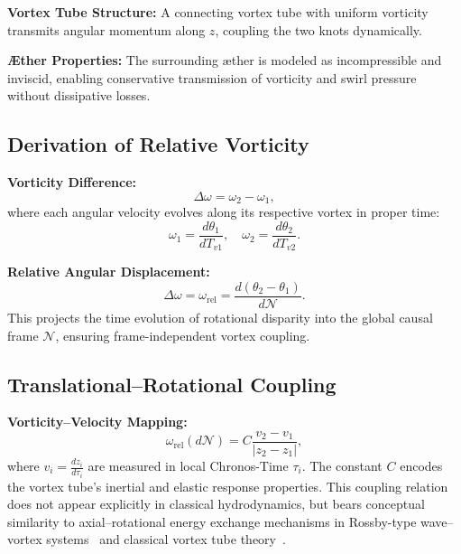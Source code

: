 \documentclass[12pt]{article}
\begin{document}
    \textbf{Vortex Tube Structure:} A connecting vortex tube with uniform vorticity transmits angular momentum along \( z \), coupling the two knots dynamically.

    \textbf{Æther Properties:} The surrounding æther is modeled as incompressible and inviscid, enabling conservative transmission of vorticity and swirl pressure without dissipative losses.

    \subsection{Derivation of Relative Vorticity}

    \textbf{Vorticity Difference:}
    \begin{equation*}
        \Delta \omega = \omega_2 - \omega_1,
    \end{equation*}
    where each angular velocity evolves along its respective vortex in proper time:
    \begin{equation*}
        \omega_1 = \frac{d\theta_1}{dT_{v1}}, \quad \omega_2 = \frac{d\theta_2}{dT_{v2}}.
    \end{equation*}

    \textbf{Relative Angular Displacement:}
    \begin{equation*}
        \Delta \omega = \omega_\text{rel} = \frac{d(\theta_2 - \theta_1)}{d\mathcal{N}}.
    \end{equation*}
    This projects the time evolution of rotational disparity into the global causal frame \( \mathcal{N} \), ensuring frame-independent vortex coupling.

    \subsection*{Translational–Rotational Coupling}

    \textbf{Vorticity–Velocity Mapping:}
    \begin{equation*}
        \omega_\text{rel}(d\mathcal{N}) = C \frac{v_2 - v_1}{|z_2 - z_1|},
    \end{equation*}
    where \( v_i = \frac{dz_i}{d\tau_i} \) are measured in local Chronos-Time \( \tau_i \). The constant \( C \) encodes the vortex tube’s
inertial and elastic response properties. This coupling relation does not appear explicitly in classical hydrodynamics, but bears conceptual similarity to axial–rotational energy exchange mechanisms in Rossby-type wave–vortex systems~\cite{rossby1939} and classical vortex tube theory~\cite{lamb1932, batchelor2000}.
\end{document}
